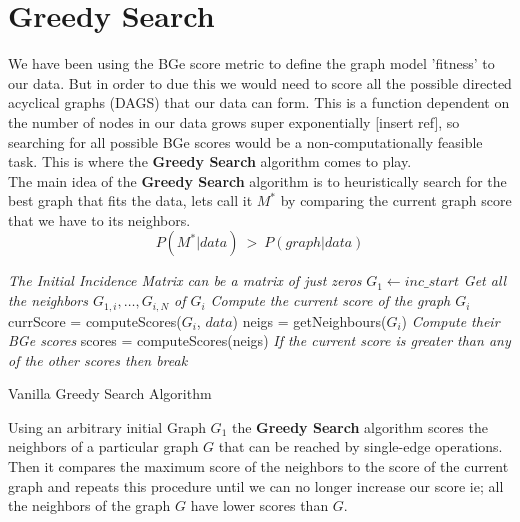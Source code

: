 \documentclass{article}
\begin{document}
	\section{Greedy Search}
	We have been using the BGe score metric to define the graph model 'fitness'
	to our data. But in order to due this we would need to score all the possible
	directed acyclical graphs (DAGS) that our data can form. This is a function
	dependent on the number of nodes in our data grows super exponentially
	[insert ref], so searching for all possible BGe scores would be a
	non-computationally feasible task. This is where the \textbf{Greedy Search}
	algorithm comes to play. 
	\\
	The main idea of the \textbf{Greedy Search} algorithm is to heuristically
	search for the best graph that fits the data, lets call it $M^{*}$ by
	comparing the current graph score that we have to its neighbors.
	\begin{equation}
		P(M^{*}|data) \ > \ P(graph | data)
	\end{equation}
	\begin{algorithm}[H]
	\SetAlgoLined
	\emph{The Initial Incidence Matrix can be a matrix of just zeros}\;
	$G_{1} \gets inc\_start$\;	
	\emph{Get all the neighbors $G_{1,i},\dots,G_{i,N}$ of $G_{i}$}\;	
	 {
	\emph{Compute the current score of the graph $G_{i}$}\;
	currScore = computeScores($G_{i}$, $data$)\;
	neigs = getNeighbours($G_i$)\;	
	\emph{Compute their BGe scores}\;
	scores = computeScores(neigs)\;
	\emph{If the current score is greater than any of the other scores then
	break}\;
	}
	\caption{Vanilla Greedy Search Algorithm}
	\label{alg:greedy}
	\end{algorithm}		
	Using an arbitrary initial Graph $G_{1}$ the \textbf{Greedy Search} algorithm
	scores the neighbors of a particular
	graph $G$ that can be reached by single-edge operations. Then it compares the
	maximum score of the neighbors to the score of the current graph and repeats
	this procedure until we can no longer increase our score ie; all the
	neighbors of the graph $G$ have lower scores than $G$.
\end{document}
